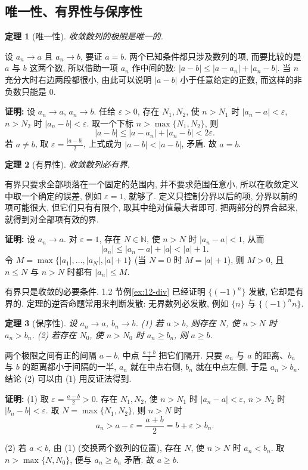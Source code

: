 \documentclass[UTF8,openany]{ctexbook}
\theoremstyle{chinesetextbook}
\newtheorem{theorem}{定理}[section]
\newenvironment{cnproof}{\par\indent\textbf{证明:} \ignorespaces}{\par}
\begin{document}
\subsection{唯一性、有界性与保序性}
\begin{theorem}[唯一性]
收敛数列的极限是唯一的.
\end{theorem}
设 $a_n\to a$ 且 $a_n\to b$, 要证 $a=b$. 两个已知条件都只涉及数列的项, 而要比较的是 $a$ 与 $b$ 这两个数, 所以借助一项 $a_n$ 作中间的数: $|a-b|\le|a-a_n|+|a_n-b|$. 当 $n$ 充分大时右边两段都很小, 由此可以说明 $|a-b|$ 小于任意给定的正数, 而这样的非负数只能是 $0$.
\begin{cnproof}
设 $a_n\to a$, $a_n\to b$. 任给 $\varepsilon>0$, 存在 $N_1,N_2$, 使 $n>N_1$ 时 $|a_n-a|<\varepsilon$, $n>N_2$ 时 $|a_n-b|<\varepsilon$. 取一个下标 $n>\max\{N_1,N_2\}$, 则
\[
|a-b|\le|a-a_n|+|a_n-b|<2\varepsilon.
\]
若 $a\ne b$, 取 $\displaystyle\varepsilon=\frac{|a-b|}2$, 上式成为 $|a-b|<|a-b|$, 矛盾. 故 $a=b$.
\end{cnproof}
\begin{theorem}[有界性]
收敛数列必有界.
\end{theorem}
有界只要求全部项落在一个固定的范围内, 并不要求范围任意小, 所以在收敛定义中取一个确定的误差, 例如 $\varepsilon=1$, 就够了. 定义只控制分界以后的项, 分界以前的项可能很大, 但它们只有有限个, 取其中绝对值最大者即可. 把两部分的界合起来, 就得到对全部项有效的界.
\begin{cnproof}
设 $a_n\to a$. 对 $\varepsilon=1$, 存在 $N\in\mathbb N$, 使 $n>N$ 时 $|a_n-a|<1$, 从而
\[
|a_n|\le|a_n-a|+|a|<|a|+1.
\]
令 $M=\max\{|a_1|,\ldots,|a_N|,|a|+1\}$ (当 $N=0$ 时 $M=|a|+1$), 则 $M>0$, 且 $n\le N$ 与 $n>N$ 时都有 $|a_n|\le M$.
\end{cnproof}
有界只是收敛的必要条件. 1.2 节例\ref{ex:12-div} 已经证明 $\{(-1)^n\}$ 发散, 它却是有界的. 定理的逆否命题常用来判断发散: 无界数列必发散, 例如 $\{n\}$ 与 $\{(-1)^nn\}$.
\begin{theorem}[保序性]
设 $a_n\to a$, $b_n\to b$. \textup{(1)} 若 $a>b$, 则存在 $N$, 使 $n>N$ 时 $a_n>b_n$. \textup{(2)} 若存在 $N_0$, 使 $n>N_0$ 时 $a_n\ge b_n$, 则 $a\ge b$.
\end{theorem}
两个极限之间有正的间隔 $a-b$, 中点 $\displaystyle\frac{a+b}2$ 把它们隔开. 只要 $a_n$ 与 $a$ 的距离、$b_n$ 与 $b$ 的距离都小于间隔的一半, $a_n$ 就在中点右侧, $b_n$ 就在中点左侧, 于是 $a_n>b_n$. 结论 (2) 可以由 (1) 用反证法得到.
\begin{cnproof}
(1) 取 $\displaystyle\varepsilon=\frac{a-b}2>0$. 存在 $N_1,N_2$, 使 $n>N_1$ 时 $|a_n-a|<\varepsilon$, $n>N_2$ 时 $|b_n-b|<\varepsilon$. 取 $N=\max\{N_1,N_2\}$, 则 $n>N$ 时
\[
a_n>a-\varepsilon=\frac{a+b}2=b+\varepsilon>b_n.
\]

(2) 若 $a<b$, 由 (1) (交换两个数列的位置), 存在 $N$, 使 $n>N$ 时 $a_n<b_n$. 取 $n>\max\{N,N_0\}$, 便与 $a_n\ge b_n$ 矛盾. 故 $a\ge b$.
\end{cnproof}
\end{document}
